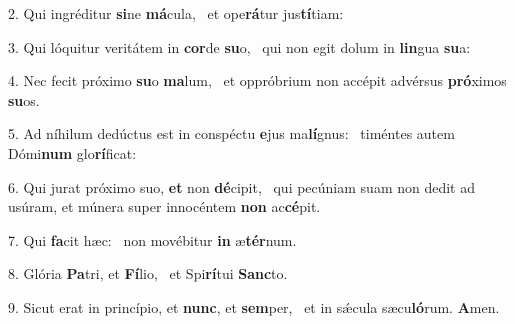 2. Qui ingréditur \textbf{si}ne \textbf{má}cula, \ast\  et ope\textbf{rá}tur jus\textbf{tí}tiam:\

3. Qui lóquitur veritátem in \textbf{cor}de \textbf{su}o, \ast\  qui non egit dolum in \textbf{lin}gua \textbf{su}a:\

4. Nec fecit próximo \textbf{su}o \textbf{ma}lum, \ast\  et oppróbrium non accépit advérsus \textbf{pró}ximos \textbf{su}os.\

5. Ad níhilum dedúctus est in conspéctu \textbf{e}jus ma\textbf{lí}gnus: \ast\  timéntes autem Dómi\textbf{num} glo\textbf{rí}ficat:\

6. Qui jurat próximo suo, \textbf{et} non \textbf{dé}cipit, \ast\  qui pecúniam suam non dedit ad usúram, et múnera super innocéntem \textbf{non} ac\textbf{cé}pit.\

7. Qui \textbf{fa}cit hæc: \ast\  non movébitur \textbf{in} æ\textbf{tér}num.\

8. Glória \textbf{Pa}tri, et \textbf{Fí}lio, \ast\  et Spi\textbf{rí}tui \textbf{Sanc}to.\

9. Sicut erat in princípio, et \textbf{nunc}, et \textbf{sem}per, \ast\  et in sǽcula sæcu\textbf{ló}rum. \textbf{A}men.\


